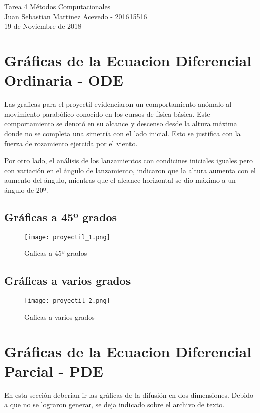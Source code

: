 \documentclass[11pt,letterpaper]{exam}
\begin{document}
\begin{center}
{\Large  Tarea 4 Métodos Computacionales} \\
Juan Sebastian Martinez Acevedo - \textsc{201615516}\\
19 de Noviembre de 2018\\
\end{center}


\noindent

\section{Gráficas de la Ecuacion Diferencial Ordinaria - ODE}
Las graficas para el proyectil evidenciaron un comportamiento anómalo al movimiento parabólico conocido en los cursos de física básica. Este comportamiento se denotó en su alcance y descenso desde la altura máxima donde no se completa una simetría con el lado inicial. Esto se justifica con la fuerza de rozamiento ejercida por el viento. 

Por otro lado, el análisis de los lanzamientos con condicines iniciales iguales pero con variación en el ángulo de lanzamiento, indicaron que la altura aumenta con el aumento del ángulo, mientras que el alcance horizontal se dio máximo a un ángulo de 20º. 

\subsection{Gráficas a 45º grados}
\begin{figure}[H]
\centering
\texttt{[image: proyectil\_1.png]}
\caption{Gaficas a 45º grados}\label{Fi:Imag3}
\end{figure}

\subsection{Gráficas a varios grados}
\begin{figure}[H]
\centering
\texttt{[image: proyectil\_2.png]}
\caption{Gaficas a varios grados}\label{Fi:Imag3}
\end{figure}

\section{Gráficas de la Ecuacion Diferencial Parcial - PDE}

En esta sección deberían ir las gráficas de la difusión en dos dimensiones. Debido a que no se lograron generar, se deja indicado sobre el archivo de texto. 
\end{document}
